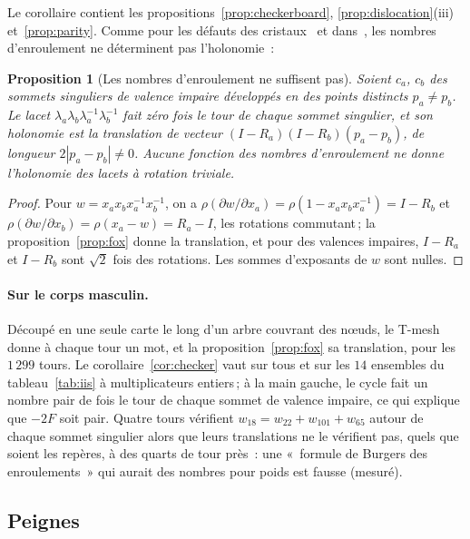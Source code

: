 \documentclass[11pt,a4paper]{article}
\newtheorem{proposition}{Proposition}
\begin{document}
Le corollaire contient les propositions~\ref{prop:checkerboard},
\ref{prop:dislocation}(iii) et~\ref{prop:parity}. Comme pour les défauts des
cristaux~\cite{kleman2008disclinations} et
dans~\cite[\S7]{izmestiev2013torus}, les nombres d'enroulement ne déterminent
pas l'holonomie~:

\begin{proposition}[Les nombres d'enroulement ne suffisent pas]\label{prop:commutator}
Soient $c_a$, $c_b$ des sommets singuliers de valence impaire développés en
des points distincts $p_a \neq p_b$. Le lacet $\lambda_a \lambda_b
\lambda_a^{-1} \lambda_b^{-1}$ fait zéro fois le tour de chaque sommet
singulier, et son holonomie est la translation de vecteur $(I - R_a)(I -
R_b)(p_a - p_b)$, de longueur $2|p_a - p_b| \neq 0$. Aucune fonction des
nombres d'enroulement ne donne l'holonomie des lacets à rotation triviale.
\end{proposition}

\begin{proof}
Pour $w = x_a x_b x_a^{-1} x_b^{-1}$, on a $\rho(\partial w/\partial x_a) =
\rho(1 - x_a x_b x_a^{-1}) = I - R_b$ et $\rho(\partial w/\partial x_b) =
\rho(x_a - w) = R_a - I$, les rotations commutant\,; la
proposition~\ref{prop:fox} donne la translation, et pour des valences
impaires, $I - R_a$ et $I - R_b$ sont $\sqrt2$ fois des rotations. Les sommes
d'exposants de $w$ sont nulles.
\end{proof}

\paragraph{Sur le corps masculin.}
Découpé en une seule carte le long d'un arbre couvrant des nœuds, le T-mesh
donne à chaque tour un mot, et la proposition~\ref{prop:fox} sa translation,
pour les $1\,299$ tours. Le corollaire~\ref{cor:checker} vaut sur tous et sur
les $14$ ensembles du tableau~\ref{tab:iis} à multiplicateurs entiers\,; à la
main gauche, le cycle fait un nombre pair de fois le tour de chaque sommet de
valence impaire, ce qui explique que $-2F$ soit pair. Quatre tours vérifient
$w_{18} = w_{22} + w_{101} + w_{65}$ autour de chaque sommet singulier alors
que leurs translations ne le vérifient pas, quels que soient les repères, à
des quarts de tour près~: une «~formule de Burgers des enroulements~» qui
aurait des nombres pour poids est fausse (mesuré).

\subsection{Peignes}\label{sec:combs}
\end{document}

